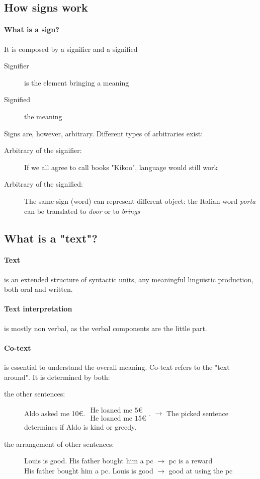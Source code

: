 \documentclass{article}
\begin{document}
\subsection{How signs work}
\label{subsec:singAndAmbiguity}
\paragraph{What is a sign?} It is composed by a signifier and a signified
\begin{description}
\item[Signifier] is the element bringing a meaning
\item[Signified] the meaning
\end{description}
Signs are, however, arbitrary. Different types of arbitraries exist:
\begin{description}
\item[Arbitrary of the signifier:] If we all agree to call books "Kikoo", language would still work
\item[Arbitrary of the signified:] The same sign (word) can represent different object: the Italian word \textit{porta} can be translated to \textit{door} or to \textit{brings}
\end{description}

\subsection{What is a "text"?}
\paragraph{Text} is an extended structure of syntactic units, any meaningful linguistic production, both oral and written.\\
\paragraph{Text interpretation} is mostly non verbal, as the verbal components are the little part.
\paragraph{Co-text}  is essential to understand the overall meaning. Co-text refers to the "text around". It is determined by both:
\begin{description}
\item[the other sentences:] Aldo asked me 10€. $\substack{\text{He loaned me 5€}\\\text{He loaned me 15€}}$. $\rightarrow$ The picked sentence determines if Aldo is kind or greedy.
\item[the arrangement of other sentences:] Louis is good. His father bought him a pc $\rightarrow$ pc is a reward\\
His father bought him a pc. Louis is good $\rightarrow$ good at using the pc
\end{description}
\end{document}
